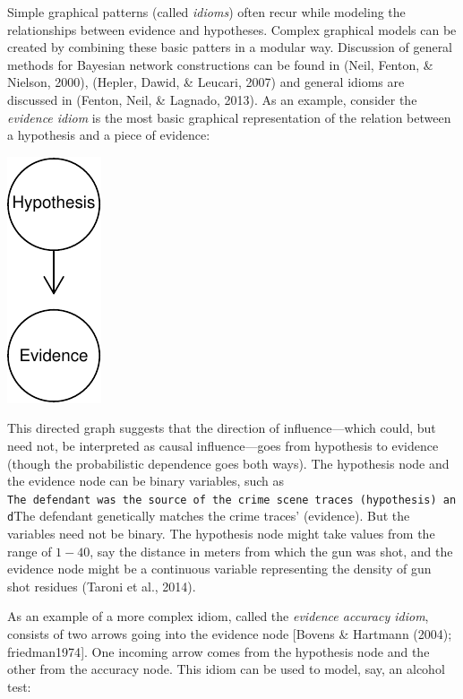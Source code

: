 \documentclass[11pt,dvipsnames,enabledeprecatedfontcommands]{scrartcl}
\begin{document}
Simple graphical patterns (called \emph{idioms}) often recur while
modeling the relationships between evidence and hypotheses. Complex
graphical models can be created by combining these basic patters in a
modular way. Discussion of general methods for Bayesian network
constructions can be found in (Neil, Fenton, \& Nielson, 2000), (Hepler,
Dawid, \& Leucari, 2007) and general idioms are discussed in (Fenton,
Neil, \& Lagnado, 2013). As an example, consider the
\emph{evidence idiom} is the most basic graphical representation of the
relation between a hypothesis and a piece of evidence:

\begin{center}\includegraphics{BNfiles/unnamed-chunk-6-1} \end{center}

\noindent  This directed graph suggests that the direction of
influence---which could, but need not, be interpreted as causal
influence---goes from hypothesis to evidence (though the probabilistic
dependence goes both ways). The hypothesis node and the evidence node
can be binary variables, such as
\texttt{The\ defendant\ was\ the\ source\ of\ the\ crime\ scene\ traces\textquotesingle{}\ (hypothesis)\ and}The
defendant genetically matches the crime traces' (evidence). But the
variables need not be binary. The hypothesis node might take values from
the range of \(1-40\), say the distance in meters from which the gun was
shot, and the evidence node might be a continuous variable representing
the density of gun shot residues (Taroni et al., 2014).

As an example of a more complex idiom, called the
\emph{evidence accuracy
idiom}, consists of two arrows going into the evidence node {[}Bovens \&
Hartmann (2004); friedman1974{]}. One incoming arrow comes from the
hypothesis node and the other from the accuracy node. This idiom can be
used to model, say, an alcohol test:
\end{document}
